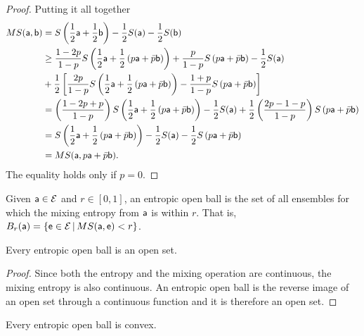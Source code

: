 \begin{proof}
	Putting it all together
	\begin{equation}
		\begin{aligned}
			MS(\ens[a],\ens[b]) &= S\left(\frac{1}{2} \ens[a] + \frac{1}{2} \ens[b]\right)- \frac{1}{2} S(\ens[a]) - \frac{1}{2} S(\ens[b]) \\
			&\geq \frac{1-2p}{1-p}S\left(\frac{1}{2} \ens[a] + \frac{1}{2}\left(p\ens[a] + \bar{p} \ens[b]\right)\right) + \frac{p}{1-p} S\left(p\ens[a] + \bar{p} \ens[b]\right) - \frac{1}{2} S(\ens[a]) \\
			&+ \frac{1}{2}\left[\frac{2p}{1-p} S\left(\frac{1}{2} \ens[a] + \frac{1}{2}\left(p\ens[a] + \bar{p} \ens[b]\right)\right) - \frac{1+p}{1-p} S\left(p \ens[a] + \bar{p} \ens[b] \right)\right] \\
			&= \left(\frac{1-2p + p}{1-p}\right)S\left(\frac{1}{2} \ens[a] + \frac{1}{2}\left(p\ens[a] + \bar{p} \ens[b]\right)\right) - \frac{1}{2} S(\ens[a]) + \frac{1}{2}\left(\frac{2p-1-p}{1-p}\right) S\left(p\ens[a] + \bar{p} \ens[b]\right) \\
			&= S\left(\frac{1}{2} \ens[a] + \frac{1}{2}\left(p\ens[a] + \bar{p} \ens[b]\right)\right) - \frac{1}{2} S(\ens[a]) - \frac{1}{2} S\left(p\ens[a] + \bar{p} \ens[b]\right) \\
			&= MS(\ens[a], p\ens[a] + \bar{p} \ens[b]).
		\end{aligned}
	\end{equation}
	The equality holds only if $p=0$.
\end{proof}

\begin{defn}
	Given $\ens[a] \in \Ens$ and $r \in [0,1]$, an entropic open ball is the set of all ensembles for which the mixing entropy from $\ens[a]$ is within $r$. That is, $B_r(\ens[a]) = \{\ens \in \Ens \, | \, MS(\ens[a], \ens) < r\}$.
\end{defn}

\begin{coro}
	Every entropic open ball is an open set.
\end{coro}

\begin{proof}
	Since both the entropy and the mixing operation are continuous, the mixing entropy is also continuous. An entropic open ball is the reverse image of an open set through a continuous function and it is therefore an open set.
\end{proof}

\begin{conj}
	Every entropic open ball is convex.
\end{conj}

